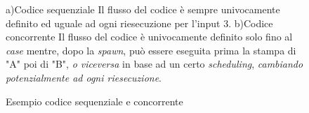 \documentclass[introduzione.tex]{subfiles}
\begin{document}
\begin{figure}[H]
\begin{multicols}{2}
a)Codice sequenziale
Il flusso del codice è sempre univocamente definito ed uguale ad ogni riesecuzione per l'input 3.
\vfill\null
\columnbreak
b)Codice concorrente
Il flusso del codice è univocamente definito solo fino al \textit{case} mentre, dopo la \textit{spawn}, può essere eseguita prima la stampa di "A" poi di "B", \textit{o viceversa} in base ad un certo \textit{scheduling}, \textit{cambiando potenzialmente ad ogni riesecuzione}.
\end{multicols}
\caption{Esempio codice sequenziale e concorrente}
\label{seqconc}
\end{figure}
\end{document}
